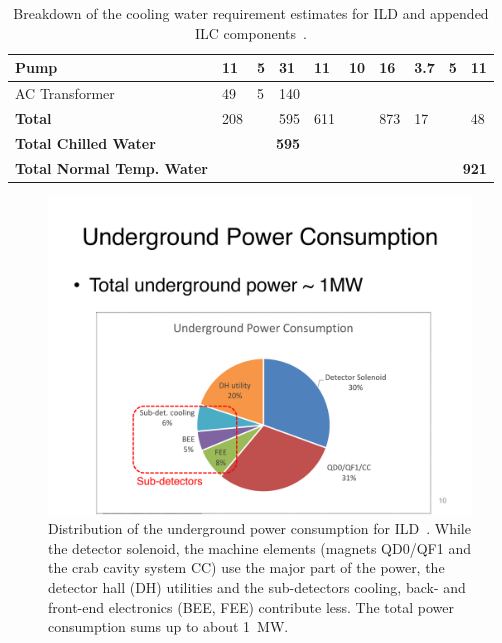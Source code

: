 \begin{table}[]
\begin{tabular}{m{1.4cm}|m{1.7cm}|m{0.6cm}|m{0.6cm}|m{0.7cm}|m{0.6cm}|m{0.6cm}|m{0.7cm}|m{0.6cm}|m{0.6cm}|m{0.7cm}}
    \multicolumn{2}{m{2cm}|}{Pump} & 11 & 5 & 31 & 11 & 10 & 16 & 3.7 & 5 & 11\\ \hline
    \multicolumn{2}{m{2cm}|}{AC Transformer} & 49 & 5 & 140 & & & & & & \\ \hline
    \multicolumn{2}{m{2cm}|}{{\bf Total}} & 208 & & 595 & 611 & & 873 & 17 & & 48 \\ \hline
    \multicolumn{2}{l|}{{\bf Total Chilled Water}} & \multicolumn{3}{r|}{{\bf 595}} & \multicolumn{6}{r}{}\\ \hline
    \multicolumn{2}{l|}{{\bf Total Normal Temp. Water}} & \multicolumn{3}{r|}{} & \multicolumn{6}{r}{{\bf 921}}\\ \hline

    \end{tabular}
    \caption{Breakdown of the cooling water requirement estimates for ILD and appended ILC components~\cite{ild:bib:services}.}
    \label{tab:integration:cooling}
\end{table}

\begin{figure}[h!]
\includegraphics[width=0.7\hsize]{Integration/fig/Power.pdf}
\caption{\label{fig:integration:power}Distribution of the underground power consumption for ILD~\cite{ild:bib:services}. While the detector solenoid, the machine elements (magnets QD0/QF1 and the crab cavity system CC) use the major part of the power, the detector hall (DH) utilities and the sub-detectors cooling, back- and front-end electronics (BEE, FEE) contribute less. The total power consumption sums up to about 1~MW.}
\end{figure}
\vspace{2cm}
\FloatBarrier

